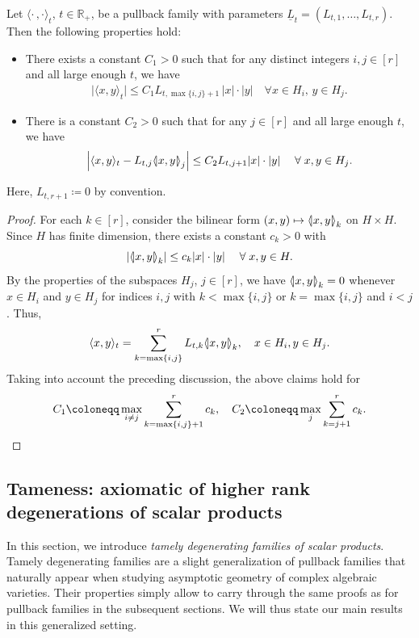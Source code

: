 \documentclass[AHL,Unicode,longabstracts]{cedram}
\newcommand{\innone}[2]{{\langle#2\rangle_{#1}}}
\newcommand{\llangle}{\mathopen{\langle\mkern -3.1mu\lvert}}
\newcommand{\rrangle}{\mathclose{\rvert\mkern -3.1mu\rangle}}
\newcommand{\highinn}[2]{{\llangle#2\rrangle_{#1}}}
\newcommand{\refnorm}[1]{\lvert#1\rvert}
\newcommand{\abs}[1]{\lvert #1\rvert}
\newcommand{\abss}[1]{\left\lvert #1\right\rvert}
\newcommand{\R}{\mathbb{R}}
\let\oldmapsto\mapsto
\renewcommand*{\mapsto}{\mathchoice{\longmapsto}{\oldmapsto}{\oldmapsto}{\oldmapsto}}
\let\oldforall\forall
\renewcommand*{\forall}{\mathrel{\oldforall}}
\begin{document}
\begin{prop}\label{prop:tame_properties_toy}
Let $\innone{t}{\cdot\,,\cdot}$, $t \in \R_+$, be a pullback family with parameters $\underline L_t = (L_{t,1}, \dots, L_{t,r})$. Then the following properties hold:
\begin{itemize}
\item There exists a constant $C_1>0$ such that for any distinct integers $i,j\in [r]$ and all large enough $t$, we have
\begin{align}\label{eq:toy_tame1}
\abs{\innone{t}{x,y}} \le C_1 L_{t,\max\{i,j\}+1}\, \refnorm{x} \cdot \refnorm{y} \quad \forall x\in H_i, \, y \in H_j.
\end{align}
\item There is a constant $C_2>0$ such that for any $j\in [r]$ and all large enough $t$, we have
\begin{align}\label{eq:toy_tame2}
\abss{ \innone{t}{x, y} - L_{t,j} \highinn{j}{x, y}} \le C_2 L_{t,j+1} \refnorm{x} \cdot \refnorm{y} \quad \forall x,y\in H_j.
\end{align}
\end{itemize}
Here, $L_{t, r+1}\coloneqq0$ by convention.
\end{prop}



\begin{proof}
For each $k \in [r]$, consider the bilinear form $(x,y) \mapsto \highinn{k}{x,y}$ on $H \times H$. Since $H$ has finite dimension, there exists a constant $c_k >0$ with
\[
\abss{\highinn{k}{x,y}} \le c_k \refnorm{x} \cdot \refnorm{y} \quad \forall x,y \in H.
\]
By the properties of the subspaces $H_j$, $j \in [r]$, we have $\highinn{k}{x,y} = 0$ whenever $x \in H_i$ and $y \in H_j$ for indices $i,j$ with $k < \max\{i,j\}$ or $k = \max\{i,j\}$ and $i< j$. Thus,
\[
\innone{t}{x, y} = \sum_{k = \max \{i,j\}}^r L_{t,k} \highinn{k}{x,y}, \quad x \in H_i, y \in H_j.
\]
Taking into account the preceding discussion, the above claims hold for
\[
C_1 \coloneqq \max_{i \neq j} \sum_{k = \max \{i,j\}+1}^r c_k, \quad C_2 \coloneqq \max_j \sum_{k=j+1}^r c_k. \qedhere
\]
\end{proof}


\subsection{Tameness: axiomatic of higher rank degenerations of scalar products}
\label{ss:tameness}

In this section, we introduce \emph{tamely degenerating families of scalar products}. Tamely degenerating families are a slight generalization of pullback families that naturally appear when studying asymptotic geometry of complex algebraic varieties. Their properties simply allow to carry through the same proofs as for pullback families in the subsequent sections. We will thus state our main results in this generalized setting.
\end{document}
